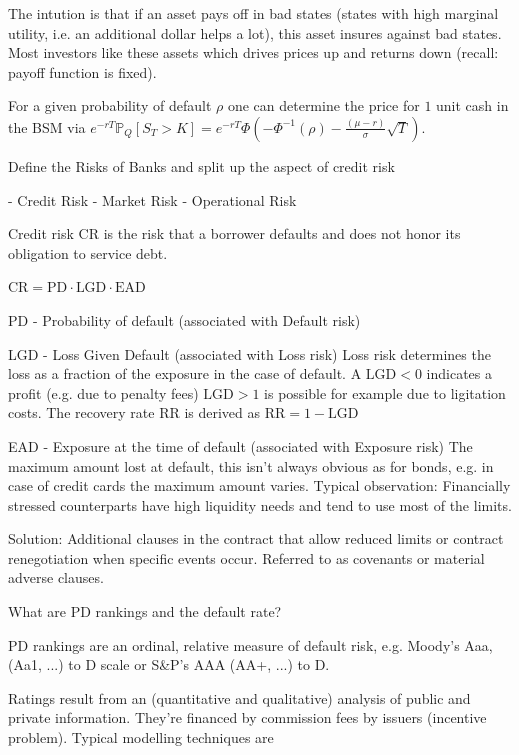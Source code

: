 The intution is that if an asset pays off in bad states (states with high marginal
utility, i.e. an additional dollar helps a lot), this asset insures
against bad states. Most investors like these assets which
drives prices up and returns down (recall: payoff function is
fixed).

For a given probability of default \( \rho \) one can determine the price for \( 1 \) unit cash in the BSM via
\( e^{-rT}\mathbb{P}_Q[S_T > K] = e^{-rT}\Phi(-\Phi^{-1}(\rho) - \frac{(\mu - r)}{\sigma}\sqrt{T}) \).



Define the Risks of Banks and split up the aspect of credit risk

- Credit Risk
- Market Risk
- Operational Risk

Credit risk \( \text{CR} \) is the risk that a borrower defaults and
does not honor its obligation to service debt.

\( \text{CR} = \text{PD}\cdot\text{LGD}\cdot\text{EAD} \)

PD - Probability of default (associated with Default risk)

LGD - Loss Given Default (associated with Loss risk)
Loss risk determines the loss as a fraction of the exposure in the
case of default. A \( \text{LGD} < 0 \) indicates a profit (e.g. due to penalty fees)
\( \text{LGD} > 1 \) is possible for example due to ligitation costs.
The recovery rate \( \text{RR} \) is derived as \( \text{RR} = 1 - \text{LGD} \)

EAD - Exposure at the time of default (associated with Exposure risk)
The maximum amount lost at default, this isn't always obvious as for bonds,
e.g. in case of credit cards the maximum amount varies. 
Typical observation: Financially stressed counterparts have
high liquidity needs and tend to use most of the limits.

Solution: Additional clauses in the contract that allow reduced
limits or contract renegotiation when specific events occur.
Referred to as covenants or material adverse clauses.



What are PD rankings and the default rate?

PD rankings are an ordinal, relative measure of default risk,
e.g. Moody's Aaa, (Aa1, ...) to D scale or S\&P's AAA (AA+, ...) to D.

Ratings result from an (quantitative and qualitative) analysis of public and
private information. They're financed by commission fees by issuers (incentive problem).
Typical modelling techniques are

